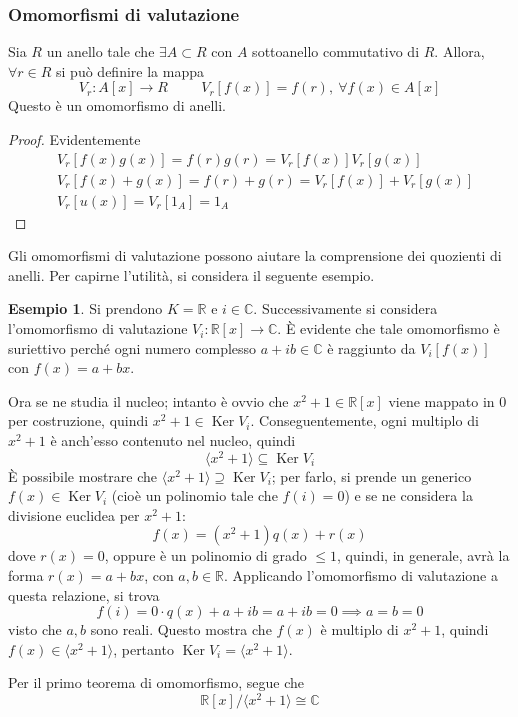 \documentclass[11pt, a4paper]{scrartcl}
\theoremstyle{definition}
\newtheorem{esempio}{Esempio}
\numberwithin{esempio}{section}
\theoremstyle{definition}
\numberwithin{obs}{section}
\numberwithin{nota}{section}
\numberwithin{equation}{subsection}
\begin{document}
\subsubsection{Omomorfismi di valutazione}
Sia $R$ un anello tale che $\exists A \subset R$ con $A$ sottoanello commutativo di $R$.
Allora, $\forall r \in R$ si pu\`o definire la mappa
\[
	V_r : A[x] \to R \hspace{1cm} V_r[f(x)] = f(r), \ \forall f(x) \in A[x]
\] 
Questo \`e un omomorfismo di anelli.
\begin{proof}
	Evidentemente
	\[
	\begin{split}
		&V_r [f(x) g(x)]= f(r) g(r) = V_r[f(x)]V_r[g(x)]\\
		&V_r [f(x) + g(x)] = f(r) + g(r) = V_r[f(x)] + V_r[g(x)]\\
		&V_r[u(x)] = V_r[1_A] = 1_A
	\end{split}
	\] 
\end{proof}
Gli omomorfismi di valutazione possono aiutare la comprensione dei quozienti di anelli.
Per capirne l'utilit\`a, si considera il seguente esempio.
\begin{esempio}
Si prendono $K = \mathbb{R}$ e $i \in \mathbb{C}$.
Successivamente si considera l'omomorfismo di valutazione $V_i : \mathbb{R}[x] \to \mathbb{C}$.
\`E evidente che tale omomorfismo \`e suriettivo perch\'e ogni numero complesso $a+ib \in \mathbb{C}$ \`e raggiunto da $V_i[f(x)]$ con $f(x) = a + bx$.

Ora se ne studia il nucleo; intanto \`e ovvio che $x^2 + 1 \in \mathbb{R}[x]$ viene mappato in $0$ per costruzione, quindi $x^2 + 1 \in \operatorname{Ker} V_i $.
Conseguentemente, ogni multiplo di $x^2 + 1$ \`e anch'esso contenuto nel nucleo, quindi 
\[
\langle x^2 +1  \rangle \subseteq \operatorname{Ker} V_i
\] 
\`E possibile mostrare che $\langle x^2 + 1 \rangle\supseteq \operatorname{Ker} V_i$; per farlo, si prende un generico $f(x) \in \operatorname{Ker} V_i$ (cio\`e un polinomio tale che $f(i) = 0$) e se ne considera la divisione euclidea per $x^2 +1 $:
\[
f(x) = (x^2 +1) q(x) + r(x)
\] 
dove $r(x)=0$, oppure \`e un polinomio di grado $\le 1$, quindi, in generale, avr\`a la forma $r(x) = a +bx$, con $a,b \in \mathbb{R}$. 
Applicando l'omomorfismo di valutazione a questa relazione, si trova
\[
f(i) = 0\cdot q(x) + a + ib = a+ib = 0 \implies a = b = 0
\] 
visto che $a,b$ sono reali.
Questo mostra che $f(x) $ \`e multiplo di $x^2 + 1$, quindi $f(x) \in \langle x^2 + 1 \rangle$, pertanto $\operatorname{Ker} V_i = \langle x^2 + 1 \rangle$.

Per il primo teorema di omomorfismo, segue che 
\[
	\mathbb{R}[x] / \langle x^2 + 1 \rangle \cong \mathbb{C}
\] 
\end{esempio}
\end{document}
